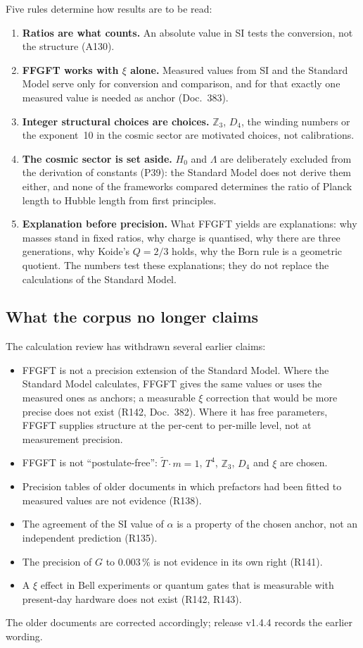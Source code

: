 Five rules determine how results are to be read:
\begin{enumerate}[leftmargin=*,itemsep=2pt]
\item \textbf{Ratios are what counts.} An absolute value in SI tests the conversion, not the
  structure (A130).
\item \textbf{FFGFT works with $\xi$ alone.} Measured values from SI and the Standard Model serve
  only for conversion and comparison, and for that exactly one measured value is needed as anchor
  (Doc.~383).
\item \textbf{Integer structural choices are choices.} $\mathbb{Z}_3$, $D_4$, the winding numbers
  or the exponent~10 in the cosmic sector are motivated choices, not calibrations.
\item \textbf{The cosmic sector is set aside.} $H_0$ and $\Lambda$ are deliberately excluded from
  the derivation of constants (P39): the Standard Model does not derive them either, and none of
  the frameworks compared determines the ratio of Planck length to Hubble length from first
  principles.
\item \textbf{Explanation before precision.} What FFGFT yields are explanations: why masses stand
  in fixed ratios, why charge is quantised, why there are three generations, why Koide's $Q=2/3$
  holds, why the Born rule is a geometric quotient. The numbers test these explanations; they do
  not replace the calculations of the Standard Model.
\end{enumerate}

\subsection{What the corpus no longer claims}

The calculation review has withdrawn several earlier claims:
\begin{itemize}[leftmargin=*,itemsep=1pt]
\item FFGFT is not a precision extension of the Standard Model. Where the Standard Model
  calculates, FFGFT gives the same values or uses the measured ones as anchors; a measurable $\xi$
  correction that would be more precise does not exist (R142, Doc.~382). Where it has free
  parameters, FFGFT supplies structure at the per-cent to per-mille level, not at measurement
  precision.
\item FFGFT is not ``postulate-free'': $\tilde T\cdot m=1$, $T^4$, $\mathbb{Z}_3$, $D_4$ and $\xi$
  are chosen.
\item Precision tables of older documents in which prefactors had been fitted to measured values
  are not evidence (R138).
\item The agreement of the SI value of $\alpha$ is a property of the chosen anchor, not an
  independent prediction (R135).
\item The precision of $G$ to $0.003\,\%$ is not evidence in its own right (R141).
\item A $\xi$ effect in Bell experiments or quantum gates that is measurable with present-day
  hardware does not exist (R142, R143).
\end{itemize}
The older documents are corrected accordingly; release v1.4.4 records the earlier wording.


